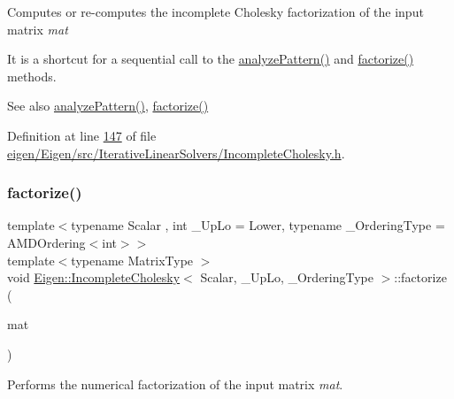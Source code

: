 Computes or re-\/computes the incomplete Cholesky factorization of the input matrix {\itshape mat} 

It is a shortcut for a sequential call to the \hyperlink{class_eigen_1_1_incomplete_cholesky_a702560ecdddef77dc51d20ab22bd974e}{analyze\+Pattern()} and \hyperlink{class_eigen_1_1_incomplete_cholesky_ac39c75ff7ca5d2db9a9f03b937e12601}{factorize()} methods.

\begin{DoxySeeAlso}{See also}
\hyperlink{class_eigen_1_1_incomplete_cholesky_a702560ecdddef77dc51d20ab22bd974e}{analyze\+Pattern()}, \hyperlink{class_eigen_1_1_incomplete_cholesky_ac39c75ff7ca5d2db9a9f03b937e12601}{factorize()} 
\end{DoxySeeAlso}


Definition at line \hyperlink{eigen_2_eigen_2src_2_iterative_linear_solvers_2_incomplete_cholesky_8h_source_l00147}{147} of file \hyperlink{eigen_2_eigen_2src_2_iterative_linear_solvers_2_incomplete_cholesky_8h_source}{eigen/\+Eigen/src/\+Iterative\+Linear\+Solvers/\+Incomplete\+Cholesky.\+h}.

\mbox{\label{class_eigen_1_1_incomplete_cholesky_ac39c75ff7ca5d2db9a9f03b937e12601}} 
\subsubsection{\texorpdfstring{factorize()}{factorize()}\hspace{0.1cm}{\footnotesize\ttfamily [1/2]}}
{\footnotesize\ttfamily template$<$typename Scalar , int \+\_\+\+Up\+Lo = Lower, typename \+\_\+\+Ordering\+Type  = A\+M\+D\+Ordering$<$int$>$$>$ \\
template$<$typename Matrix\+Type $>$ \\
void \hyperlink{class_eigen_1_1_incomplete_cholesky}{Eigen\+::\+Incomplete\+Cholesky}$<$ Scalar, \+\_\+\+Up\+Lo, \+\_\+\+Ordering\+Type $>$\+::factorize (\begin{DoxyParamCaption}\item[{const Matrix\+Type \&}]{mat }\end{DoxyParamCaption})}



Performs the numerical factorization of the input matrix {\itshape mat}. 

